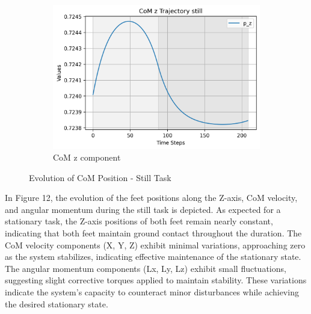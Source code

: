 \documentclass[main.tex]{subfiles}
\begin{document}
\begin{figure}[H]
\begin{subfigure}[b]{0.32\textwidth}
        \includegraphics[width=\textwidth]{figures/CoM z Trajectory still.png}
        \caption{CoM z component}
        \label{fig:sub3}
    \end{subfigure}
    \caption{Evolution of CoM Position - Still Task}
    \label{fig:threeimages}
\end{figure}
In Figure 12, the evolution of the feet positions along the Z-axis, CoM velocity, and angular momentum during the still task is depicted. As expected for a stationary task, the Z-axis positions of both feet remain nearly constant, indicating that both feet maintain ground contact throughout the duration. The CoM velocity components (X, Y, Z) exhibit minimal variations, approaching zero as the system stabilizes, indicating effective maintenance of the stationary state. The angular momentum components (Lx, Ly, Lz) exhibit small fluctuations, suggesting slight corrective torques applied to maintain stability. These variations indicate the system’s capacity to counteract minor disturbances while achieving the desired stationary state. 
\end{document}
